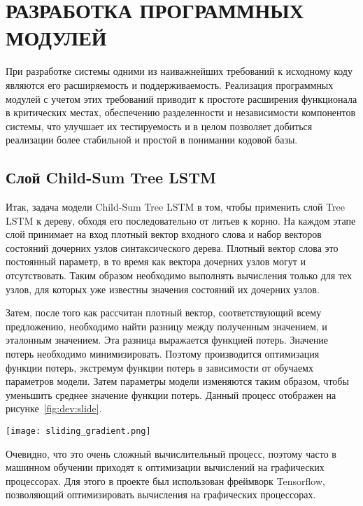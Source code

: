 \section{РАЗРАБОТКА ПРОГРАММНЫХ МОДУЛЕЙ}
\label{sec:development}
При разработке системы одними из наиважнейших требований к исходному коду являются его расширяемость и поддерживаемость. Реализация программных модулей с учетом этих требований приводит к простоте расширения функционала в критических местах, обеспечению разделенности и независимости компонентов системы, что улучшает их тестируемость и в целом позволяет добиться реализации более стабильной и простой в понимании кодовой базы.

\subsection{Слой Child-Sum Tree LSTM}
Итак, задача модели Child-Sum Tree LSTM в том, чтобы применить слой Tree LSTM к дереву, обходя его последовательно от литьев к корню. На каждом этапе слой принимает на вход плотный вектор входного слова и набор векторов состояний дочерних узлов синтаксического дерева. Плотный вектор слова это постоянный параметр, в то время как вектора дочерних узлов могут и отсутствовать. Таким образом необходимо выполнять вычисления только для тех узлов, для которых уже известны значения состояний их дочерних узлов.

Затем, после того как рассчитан плотный вектор, соответствующий всему предложению, необходимо найти разницу между полученным значением, и эталонным значением. Эта разница выражается функцией потерь. Значение потерь необходимо минимизировать. Поэтому производится оптимизация функции потерь, экстремум функции потерь в зависимости от обучаемх параметров модели. Затем параметры модели изменяются таким образом, чтобы уменьшить среднее значение функции потерь. Данный процесс отображен на рисунке~\ref{fig:dev:slide}.

\begin{center}
  \texttt{[image: sliding\_gradient.png]}
  \label{fig:dev:slide}
\end{center}

Очевидно, что это очень сложный вычислительный процесс, поэтому часто в машинном обучении приходят к оптимизации вычислений на графических процессорах. Для этого в проекте был использован фреймворк Tensorflow, позволяющий оптимизировать вычисления на графических процессорах.

